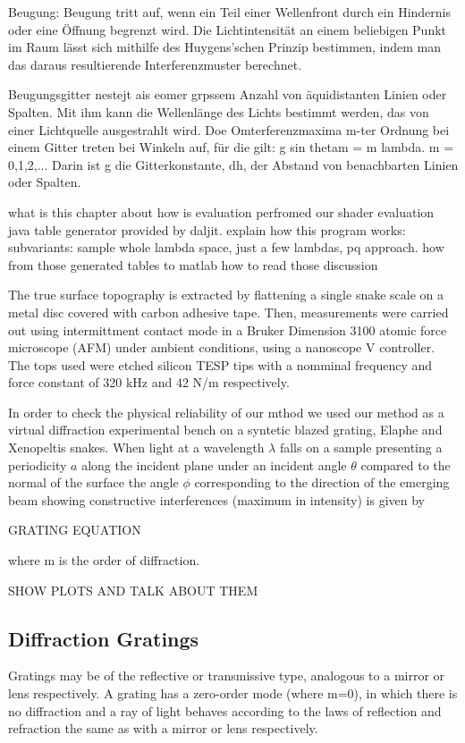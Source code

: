 Beugung: Beugung tritt auf, wenn ein Teil einer Wellenfront durch ein Hindernis oder eine Öffnung begrenzt wird. Die Lichtintensität an einem beliebigen Punkt im Raum lässt sich mithilfe des Huygens'schen Prinzip bestimmen, indem man das daraus resultierende Interferenzmuster berechnet.

Beugungsgitter nestejt ais eomer grpssem Anzahl von äquidistanten Linien oder Spalten. Mit ihm kann die Wellenlänge des Lichts bestimmt werden, das von einer Lichtquelle ausgestrahlt wird. Doe Omterferenzmaxima m-ter Ordnung bei einem Gitter treten bei Winkeln auf, für die gilt: g sin thetam = m lambda. m = 0,1,2,...
Darin ist g die Gitterkonstante, dh, der Abstand von benachbarten Linien oder Spalten.







what is this chapter about
how is evaluation perfromed
our shader
evaluation java table generator provided by daljit.
explain how this program works:
subvariants: sample whole lambda space, just a few lambdas, pq approach.
how from those generated tables to matlab
how to read those
discussion

The true surface topography is extracted by flattening a single snake scale on a metal disc covered with carbon adhesive tape. Then, measurements were carried out using intermittment contact mode in a Bruker Dimension 3100 atomic force microscope (AFM) under ambient conditions, using a nanoscope V controller. The tops used were etched silicon TESP tips with a nomminal frequency and force constant of 320 kHz and 42 N/m respectively. 

In order to check the physical reliability of our mthod we used our method as a virtual diffraction experimental bench on a syntetic blazed grating, Elaphe and Xenopeltis snakes. When light at a wavelength $\lambda$ falls on a sample presenting a periodicity $a$ along the incident plane under an incident angle $\theta$ compared to the normal of the surface the angle $\phi$ corresponding to the direction of the emerging beam showing constructive interferences (maximum in intensity) is given by

GRATING EQUATION

where m is the order of diffraction. 

SHOW PLOTS AND TALK ABOUT THEM


\subsection{Diffraction Gratings}
Gratings may be of the reflective or transmissive type, analogous to a mirror or lens respectively. A grating has a zero-order mode (where m=0), in which there is no diffraction and a ray of light behaves according to the laws of reflection and refraction the same as with a mirror or lens respectively.

